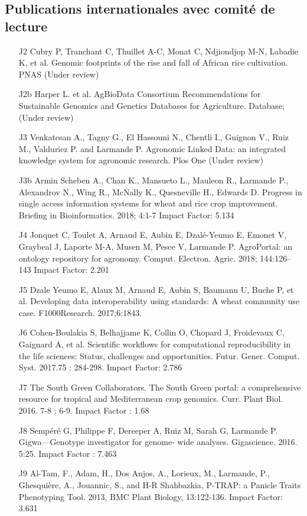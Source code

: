 \subsection*{Publications internationales avec comité de lecture} 
\begin{itemize} 
\item [J2]	Cubry P, Tranchant C, Thuillet A-C, Monat C, Ndjiondjop M-N, Labadie K, et al.  Genomic footprints of the rise and fall of African rice cultivation. PNAS (Under review)
\item [J2b] Harper L. et al. AgBioData Consortium Recommendations for Sustainable Genomics and Genetics Databases for Agriculture. Database; (Under review)
\item [J3]	Venkatesan A., Tagny G., El Hassouni N., Chentli I., Guignon V., Ruiz M., Valduriez P. and Larmande P. Agronomic Linked Data: an integrated knowledge system for agronomic research. Plos One (Under review)
\item [J3b] Armin Scheben A., Chan K., Mansueto L., Mauleon R., Larmande P., Alexandrov N., Wing R., McNally K., Quesneville
H., Edwards D. Progress in single access information systems for wheat and rice crop improvement. Briefing in Bioinformatics. 2018; 4:1-7 Impact Factor: 5.134
\item [J4]	Jonquet C, Toulet A, Arnaud E, Aubin E, Dzalé-Yeumo E, Emonet V, Graybeal J, Laporte M-A, Musen M, Pesce V, Larmande P. AgroPortal: an ontology repository for agronomy. Comput. Electron. Agric. 2018; 144:126–143 Impact Factor: 2.201
\item [J5]	Dzale Yeumo E, Alaux M, Arnaud E, Aubin S, Baumann U, Buche P, et al. Developing data interoperability using standards: A wheat community use case. F1000Research. 2017;6:1843.
\item  [J6]	Cohen-Boulakia S, Belhajjame K, Collin O, Chopard J, Froidevaux C, Gaignard A, et al. Scientific workflows for computational reproducibility in the life sciences: Status, challenges and opportunities. Futur. Gener. Comput. Syst. 2017.75 : 284-298. Impact Factor: 2.786
\item [J7]	The South Green Collaborators. The South Green portal: a comprehensive resource for tropical and Mediterranean crop genomics. Curr. Plant Biol. 2016. 7-8 : 6-9. Impact Factor : 1.68
\item [J8]	Sempéré G, Philippe F, Dereeper A, Ruiz M, Sarah G, Larmande P. Gigwa—Genotype investigator for genome- wide analyses. Gigascience. 2016. 5:25. Impact Factor : 7.463
\item [J9]	Al-Tam, F., Adam, H., Dos Anjos, A., Lorieux, M., Larmande, P., Ghesquière, A., Jouannic, S., and H-R Shahbazkia, P-TRAP: a Panicle Traits Phenotyping Tool. 2013, BMC Plant Biology, 13:122-136. Impact Factor: 3.631

\end{itemize}
